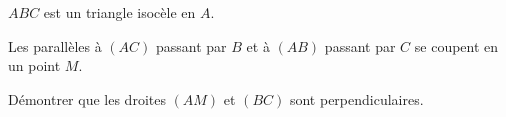 


$ABC$ est un triangle isocèle en $A$.

Les parallèles à $(AC)$ passant par $B$ et à $(AB)$ passant par $C$ se coupent en un point $M$.

Démontrer que les droites $(AM)$ et $(BC)$ sont perpendiculaires.

